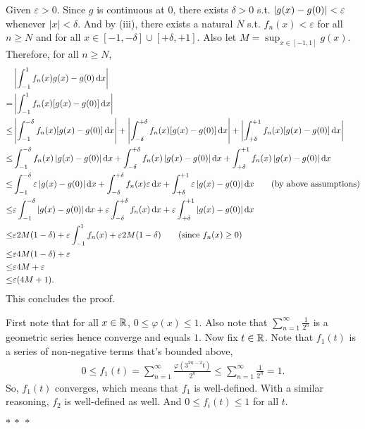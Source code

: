 \documentclass[12pt]{article}
\begin{document}
\begin{fproof}[3]
  Given \(\varepsilon>0\).
  Since \(g\) is continuous at 0, there exists \(\delta>0\) s.t. \(\left\lvert g(x)- g(0) \right\rvert<\varepsilon\) whenever \(|x| < \delta\).
  And by (iii), there exists a natural \(N\) s.t. \(f_n(x) < \varepsilon\) for all \(n \geq N\) and for all \(x \in [-1, -\delta] \cup [+\delta, +1]\).
  Also let \(M = \sup_{x \in [-1,1]} g(x)\).
  Therefore, for all \(n \geq N\),
  \begin{align*}
    &\abs{\int_{-1}^{1}f_n(x)g(x) - g(0) \dx}\\
   =& \abs{\int_{-1}^{1}f_n(x)[g(x)-g(0)] \dx}\\
   \leq & \abs{\int_{-1}^{-\delta} f_n(x)[g(x)-g(0)] \dx} + \abs{\int_{-\delta}^{+\delta} f_n(x)[g(x)-g(0)]\dx} + \abs{\int_{+\delta}^{+1} f_n(x)[g(x)-g(0)]\dx}\\
   \leq &\int_{-1}^{-\delta} f_n(x)\abs{g(x)-g(0)}\dx + \int_{-\delta}^{+\delta} f_n(x)\abs{g(x)-g(0)}\dx + \int_{+\delta}^{+1} f_n(x)\abs{g(x)-g(0)}\dx\\
   \leq& \int_{-1}^{-\delta} \varepsilon\abs{g(x)-g(0)}\dx + \int_{-\delta}^{+\delta} f_n(x) \varepsilon \dx + \int_{+\delta}^{+1} \varepsilon\abs{g(x)-g(0)}\dx \tag{by above assumptions}\\
   \leq& \varepsilon\int_{-1}^{-\delta} \abs{g(x)-g(0)}\dx + \varepsilon\int_{-\delta}^{+\delta} f_n(x) \dx + \varepsilon\int_{+\delta}^{+1}\abs{g(x)-g(0)}\dx\\
   \leq & \varepsilon 2M(1-\delta) + \varepsilon \int_{-1}^{1} f_n(x) + \varepsilon 2M(1-\delta) \tag{since \(f_n(x) \geq 0\)}\\
   \leq & \varepsilon4M(1-\delta) + \varepsilon\\
   \leq & \varepsilon4M + \varepsilon\\
   \leq & \varepsilon(4M+1).
  \end{align*}
  This concludes the proof.

\end{fproof}
\newpage

\begin{fproof}[4(a)]
    First note that for all \(x \in \mathbb {R}\), \(0 \leq \varphi(x) \leq 1\).
    Also note that \(\sum_{n=1}^{\infty}\frac{1}{2^n}\) is a geometric series hence converge and equals \(1\).
    Now fix \(t \in \mathbb {R}\).
    Note that \(f_1(t)\) is a series of non-negative terms that's bounded above,
    \begin{align*}
        0 \leq f_1(t) =  \sum_{n=1}^{\infty} \frac{\varphi(3^{2n-2}t)}{2^n} \leq \sum_{n=1}^{\infty} \frac{1}{2^n} = 1.
    \end{align*}
    So, \(f_1(t)\) converges, which means that \(f_1\) is well-defined.
    With a similar reasoning, \(f_2\) is well-defined as well.
    And \(0 \leq f_i(t) \leq 1\) for all \(t\).

    \begin{center}
        \(\ast~\ast~\ast\)
    \end{center}



\end{fproof}

\begin{fproof}[4(b)]

\end{fproof}

\begin{fproof}[4(c)]

\end{fproof}
\end{document}
